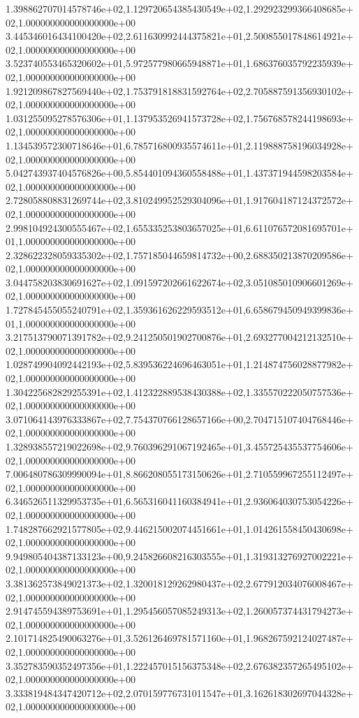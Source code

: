 1.398862707014578746e+02,1.129720654385430549e+02,1.292923299366408685e+02,1.000000000000000000e+00
3.445346016434100420e+02,2.611630992444375821e+01,2.500855017848614921e+02,1.000000000000000000e+00
3.523740553465320602e+01,5.972577980665948871e+01,1.686376035792235939e+02,1.000000000000000000e+00
1.921209867827569440e+02,1.753791818831592764e+02,2.705887591356930102e+02,1.000000000000000000e+00
1.031255095278576306e+01,1.137953526941573728e+02,1.756768578244198693e+02,1.000000000000000000e+00
1.134539572300718646e+01,6.785716800935574611e+01,2.119888758196034928e+02,1.000000000000000000e+00
5.042743937404576826e+00,5.854401094360558488e+01,1.437371944598203584e+02,1.000000000000000000e+00
2.728058808831269744e+02,3.810249952529304096e+01,1.917604187124372572e+02,1.000000000000000000e+00
2.998104924300555467e+02,1.655335253803657025e+01,6.611076572081695701e+01,1.000000000000000000e+00
2.328622328059335302e+02,1.757185044659814732e+00,2.688350213870209586e+02,1.000000000000000000e+00
3.044758203830691627e+02,1.091597202661622674e+02,3.051085010906601269e+02,1.000000000000000000e+00
1.727845455055240791e+02,1.359361626229593512e+01,6.658679450949399836e+01,1.000000000000000000e+00
3.217513790071391782e+02,9.241250501902700876e+01,2.693277004212132510e+02,1.000000000000000000e+00
1.028749904092442193e+02,5.839536224696463051e+01,1.214874756028877982e+02,1.000000000000000000e+00
1.304225682829255391e+02,1.412322889538430388e+02,1.335570222050757536e+02,1.000000000000000000e+00
3.071064143976333867e+02,7.754370766128657166e+00,2.704715107404768446e+02,1.000000000000000000e+00
1.328938557219022698e+02,9.760396291067192465e+01,3.455725435537754606e+02,1.000000000000000000e+00
7.006480786309990094e+01,8.866208055173150626e+01,2.710559967255112497e+02,1.000000000000000000e+00
6.346526511329953735e+01,6.565316041160384941e+01,2.936064030753054226e+02,1.000000000000000000e+00
1.748287662921577805e+02,9.446215002074451661e+01,1.014261558450430698e+02,1.000000000000000000e+00
9.949805404387133123e+00,9.245826608216303555e+01,1.319313276927002221e+02,1.000000000000000000e+00
3.381362573849021373e+02,1.320018129262980437e+02,2.677912034076008467e+02,1.000000000000000000e+00
2.914745594389753691e+01,1.295456057085249313e+02,1.260057374431794273e+02,1.000000000000000000e+00
2.101714825490063276e+01,3.526126469781571160e+01,1.968267592124027487e+02,1.000000000000000000e+00
3.352783590352497356e+01,1.222457015156375348e+02,2.676382357265495102e+02,1.000000000000000000e+00
3.333819484347420712e+02,2.070159776731011547e+01,3.162618302697044328e+02,1.000000000000000000e+00
